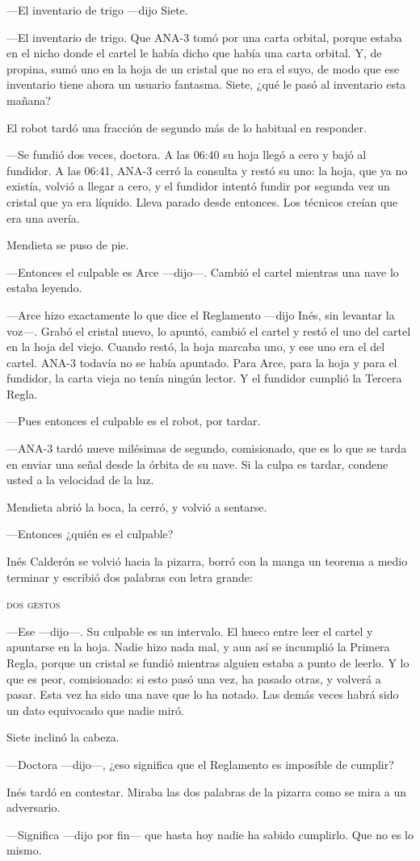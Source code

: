 ---El inventario de trigo ---dijo Siete.

---El inventario de trigo. Que ANA-3 tomó por una carta orbital, porque estaba en el nicho donde el cartel le había dicho que había una carta orbital. Y, de propina, sumó uno en la hoja de un cristal que no era el suyo, de modo que ese inventario tiene ahora un usuario fantasma. Siete, ¿qué le pasó al inventario esta mañana?

El robot tardó una fracción de segundo más de lo habitual en responder.

---Se fundió dos veces, doctora. A las 06:40 su hoja llegó a cero y bajó al fundidor. A las 06:41, ANA-3 cerró la consulta y restó su uno: la hoja, que ya no existía, volvió a llegar a cero, y el fundidor intentó fundir por segunda vez un cristal que ya era líquido. Lleva parado desde entonces. Los técnicos creían que era una avería.

Mendieta se puso de pie.

---Entonces el culpable es Arce ---dijo---\nobreak. Cambió el cartel mientras una nave lo estaba leyendo.

---Arce hizo exactamente lo que dice el Reglamento ---dijo Inés, sin levantar la voz---\nobreak. Grabó el cristal nuevo, lo apuntó, cambió el cartel y restó el uno del cartel en la hoja del viejo. Cuando restó, la hoja marcaba uno, y ese uno era el del cartel. ANA-3 todavía no se había apuntado. Para Arce, para la hoja y para el fundidor, la carta vieja no tenía ningún lector. Y el fundidor cumplió la Tercera Regla.

---Pues entonces el culpable es el robot, por tardar.

---ANA-3 tardó nueve milésimas de segundo, comisionado, que es lo que se tarda en enviar una señal desde la órbita de su nave. Si la culpa es tardar, condene usted a la velocidad de la luz.

Mendieta abrió la boca, la cerró, y volvió a sentarse.

---Entonces ¿quién es el culpable?

Inés Calderón se volvió hacia la pizarra, borró con la manga un teorema a medio terminar y escribió dos palabras con letra grande:

\begin{center}
\textsc{dos gestos}
\end{center}

---Ese ---dijo---\nobreak. Su culpable es un intervalo. El hueco entre leer el cartel y apuntarse en la hoja. Nadie hizo nada mal, y aun así se incumplió la Primera Regla, porque un cristal se fundió mientras alguien estaba a punto de leerlo. Y lo que es peor, comisionado: si esto pasó una vez, ha pasado otras, y volverá a pasar. Esta vez ha sido una nave que lo ha notado. Las demás veces habrá sido un dato equivocado que nadie miró.

Siete inclinó la cabeza.

---Doctora ---dijo---\nobreak, ¿eso significa que el Reglamento es imposible de cumplir?

Inés tardó en contestar. Miraba las dos palabras de la pizarra como se mira a un adversario.

---Significa ---dijo por fin--- que hasta hoy nadie ha sabido cumplirlo. Que no es lo mismo.
